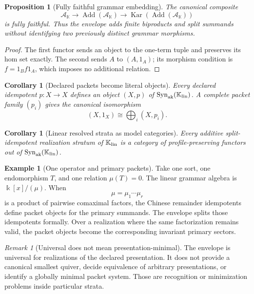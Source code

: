 \documentclass[11pt]{article}
\newtheorem{proposition}[theorem]{Proposition}
\newtheorem{corollary}[theorem]{Corollary}
\theoremstyle{definition}
\newtheorem{example}[theorem]{Example}
\theoremstyle{remark}
\newtheorem{remark}[theorem]{Remark}
\DeclareMathOperator{\Kar}{Kar}
\DeclareMathOperator{\Add}{Add}
\newcommand{\kk}{\Bbbk}
\newcommand{\Syn}{\operatorname{Syn}}
\begin{document}
\begin{proposition}[Fully faithful grammar embedding]
\label{prop:grammar-embedding}
The canonical composite
\[
\mathcal A_{\mathbb K}
\longrightarrow
\Add(\mathcal A_{\mathbb K})
\longrightarrow
\Kar(\Add(\mathcal A_{\mathbb K}))
\]
is fully faithful.  Thus the envelope adds finite biproducts and split summands without identifying two previously distinct grammar morphisms.
\end{proposition}

\begin{proof}
The first functor sends an object to the one-term tuple and preserves its hom set exactly.  The second sends \(A\) to \((A,1_A)\); its morphism condition is \(f=1_Bf1_A\), which imposes no additional relation.
\end{proof}

\begin{corollary}[Declared packets become literal objects]
\label{cor:packet-objects-literal}
Every declared idempotent \(p:X\to X\) defines an object \((X,p)\) of \(\Syn_{\mathrm{ak}}(\mathbb K_{\rm lin})\).  A complete packet family \((p_i)\) gives the canonical isomorphism
\[
(X,1_X)\cong\bigoplus_i(X,p_i).
\]
\end{corollary}

\begin{corollary}[Linear resolved strata as model categories]
\label{cor:linear-strata-model-categories}
Every additive split-idempotent realization stratum of \(\mathbb K_{\rm lin}\) is a category of profile-preserving functors out of \(\Syn_{\mathrm{ak}}(\mathbb K_{\rm lin})\).
\end{corollary}

\begin{example}[One operator and primary packets]
\label{ex:single-operator-envelope}
Take one sort, one endomorphism \(T\), and one relation \(\mu(T)=0\).  The linear grammar algebra is \(\kk[x]/(\mu)\).  When
\[
\mu=\mu_1\cdots\mu_r
\]
is a product of pairwise comaximal factors, the Chinese remainder idempotents define packet objects for the primary summands.  The envelope splits those idempotents formally.  Over a realization where the same factorization remains valid, the packet objects become the corresponding invariant primary sectors.
\end{example}

\begin{remark}[Universal does not mean presentation-minimal]
\label{rem:universal-not-minimal}
The envelope is universal for realizations of the declared presentation.  It does not provide a canonical smallest quiver, decide equivalence of arbitrary presentations, or identify a globally minimal packet system.  Those are recognition or minimization problems inside particular strata.
\end{remark}
\end{document}
